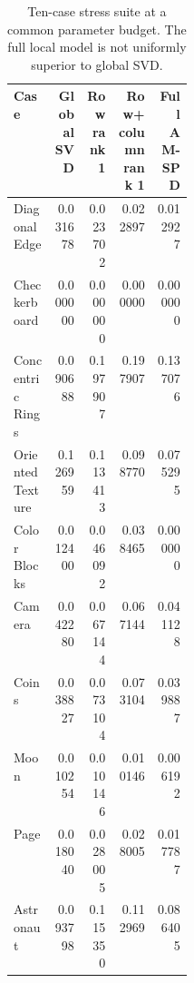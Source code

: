\begin{table}[tbp]
\centering
\footnotesize
\begin{tabular}{L{0.23\linewidth}rrrr}
\toprule
Case & Global SVD & Row rank 1 & Row+column rank 1 & Full AM-SPD\\
\midrule
Diagonal Edge & 0.031678 & 0.023702 & 0.022897 & 0.012927\\
Checkerboard & 0.000000 & 0.000000 & 0.000000 & 0.000000\\
Concentric Rings & 0.090688 & 0.197907 & 0.197907 & 0.137076\\
Oriented Texture & 0.126959 & 0.113413 & 0.098770 & 0.075295\\
Color Blocks & 0.012400 & 0.046092 & 0.038465 & 0.000000\\
Camera & 0.042280 & 0.067144 & 0.067144 & 0.041128\\
Coins & 0.038827 & 0.073104 & 0.073104 & 0.039887\\
Moon & 0.010254 & 0.010146 & 0.010146 & 0.006192\\
Page & 0.018040 & 0.028005 & 0.028005 & 0.017787\\
Astronaut & 0.093798 & 0.115350 & 0.112969 & 0.086405\\
\bottomrule
\end{tabular}
\caption{Ten-case stress suite at a common parameter budget. The full local model is not uniformly superior to global SVD.}
\label{tab:stress-suite-final}
\end{table}
